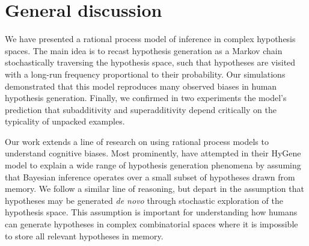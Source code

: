 


\section{General discussion}

We have presented a rational process model of inference in complex hypothesis spaces. The main idea is to recast hypothesis generation as a Markov chain stochastically traversing the hypothesis space, such that hypotheses are visited with a long-run frequency proportional to their probability. Our simulations demonstrated that this model reproduces many observed biases in human hypothesis generation. Finally, we confirmed in two experiments the model's prediction that subadditivity and superadditivity depend critically on the typicality of unpacked examples.

Our work extends a line of research on using rational process models to understand cognitive biases. Most prominently, \citet{Thomas2008} have attempted in their HyGene model to explain a wide range of hypothesis generation phenomena by assuming that Bayesian inference operates over a small subset of hypotheses drawn from memory. We follow a similar line of reasoning, but depart in the assumption that hypotheses may be generated \emph{de novo} through stochastic exploration of the hypothesis space. This assumption is important for understanding how humans can generate hypotheses in complex combinatorial spaces where it is impossible to store all relevant hypotheses in memory.

